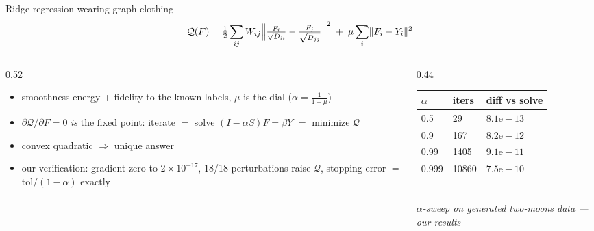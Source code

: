 \documentclass[10pt,aspectratio=169]{beamer}
\newcommand{\ourfig}[1]{\textcolor{lgcorange}{\textit{#1 --- our results}}}
\begin{document}
\begin{frame}{Ridge regression wearing graph clothing}
  \begin{equation*}
    \mathcal{Q}(F) = \tfrac{1}{2}\sum_{ij} W_{ij}
    \Bigl\lVert \tfrac{F_i}{\sqrt{D_{ii}}} - \tfrac{F_j}{\sqrt{D_{jj}}} \Bigr\rVert^{2}
    \;+\; \mu \sum_i \lVert F_i - Y_i \rVert^{2}
  \end{equation*}
  \vspace{-0.5em}
  \begin{columns}
    \begin{column}{0.52\textwidth}
      \begin{itemize}\small
        \item smoothness energy + fidelity to the known labels,
              $\mu$ is the dial \; ($\alpha = \tfrac{1}{1+\mu}$)
        \item $\partial\mathcal{Q}/\partial F = 0$ \emph{is} the fixed point:
              iterate $=$ solve $(I-\alpha S)F = \beta Y$ $=$ minimize $\mathcal{Q}$
        \item convex quadratic $\Rightarrow$ unique answer
        \item our verification: gradient zero to $2\!\times\!10^{-17}$,
              18/18 perturbations raise $\mathcal{Q}$,
              stopping error $=$ tol$/ (1{-}\alpha)$ exactly
      \end{itemize}
    \end{column}
    \begin{column}{0.44\textwidth}
      \vspace{0.3em}
      {\footnotesize
      \begin{tabular}{@{}lll@{}}
        \toprule
        $\alpha$ & iters & diff vs solve\\
        \midrule
        0.5   & 29    & $8.1\mathrm{e}{-}13$\\
        0.9   & 167   & $8.2\mathrm{e}{-}12$\\
        0.99  & 1405  & $9.1\mathrm{e}{-}11$\\
        0.999 & 10860 & $7.5\mathrm{e}{-}10$\\
        \bottomrule
      \end{tabular}}\\[0.4em]
      {\footnotesize\ourfig{$\alpha$-sweep on generated two-moons data}}
    \end{column}
  \end{columns}
\end{frame}
\end{document}

